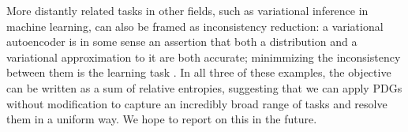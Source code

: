 \documentclass[letterpaper]{article} %
\theoremstyle{plain}
\theoremstyle{definition}
\theoremstyle{remark}
\begin{document}
More distantly related tasks in other fields, such as variational inference in
machine learning, can also be framed as inconsistency reduction: a variational 
autoencoder is in some sense an assertion that both a distribution
and a variational approximation to it are both accurate; minimmizing
the inconsistency between them is the learning task \cite{kingma2013autoencoding}. In all three of these
examples, the objective can be written as a sum of relative entropies,
suggesting that we can apply PDGs without modification to capture an incredibly 
broad range of tasks and resolve them in a uniform way.
%
We hope to report on this in the future.


\end{document}
